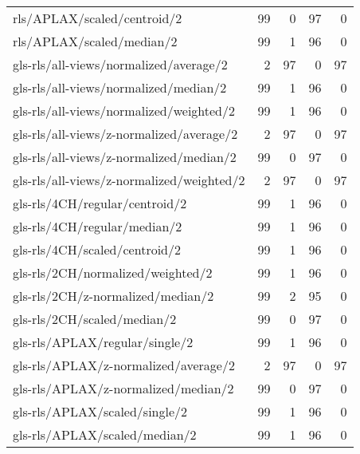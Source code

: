 \begin{longtable}{lrrrr}
    rls/APLAX/scaled/centroid/2               & 99 &  0 & 97 &  0 \\
    rls/APLAX/scaled/median/2                 & 99 &  1 & 96 &  0 \\
    gls-rls/all-views/normalized/average/2    &  2 & 97 &  0 & 97 \\
    gls-rls/all-views/normalized/median/2     & 99 &  1 & 96 &  0 \\
    gls-rls/all-views/normalized/weighted/2   & 99 &  1 & 96 &  0 \\
    gls-rls/all-views/z-normalized/average/2  &  2 & 97 &  0 & 97 \\
    gls-rls/all-views/z-normalized/median/2   & 99 &  0 & 97 &  0 \\
    gls-rls/all-views/z-normalized/weighted/2 &  2 & 97 &  0 & 97 \\
    gls-rls/4CH/regular/centroid/2            & 99 &  1 & 96 &  0 \\
    gls-rls/4CH/regular/median/2              & 99 &  1 & 96 &  0 \\
    gls-rls/4CH/scaled/centroid/2             & 99 &  1 & 96 &  0 \\
    gls-rls/2CH/normalized/weighted/2         & 99 &  1 & 96 &  0 \\
    gls-rls/2CH/z-normalized/median/2         & 99 &  2 & 95 &  0 \\
    gls-rls/2CH/scaled/median/2               & 99 &  0 & 97 &  0 \\
    gls-rls/APLAX/regular/single/2            & 99 &  1 & 96 &  0 \\
    gls-rls/APLAX/z-normalized/average/2      &  2 & 97 &  0 & 97 \\
    gls-rls/APLAX/z-normalized/median/2       & 99 &  0 & 97 &  0 \\
    gls-rls/APLAX/scaled/single/2             & 99 &  1 & 96 &  0 \\
    gls-rls/APLAX/scaled/median/2             & 99 &  1 & 96 &  0 \\
    \hline
\end{longtable}
